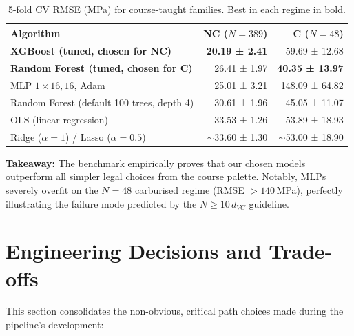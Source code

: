 \documentclass[12pt,a4paper]{article}
\begin{document}
\begin{table}[H]
\centering
\caption{5-fold CV RMSE (MPa) for course-taught families. Best in each regime in bold.}
\label{tab:bench}
\begin{tabular}{lrr}
\toprule
\textbf{Algorithm} & \textbf{NC ($N{=}389$)} & \textbf{C ($N{=}48$)} \\
\midrule
\textbf{XGBoost (tuned, chosen for NC)}            & \textbf{20.19 ± 2.41} & 59.69 ± 12.68 \\
\textbf{Random Forest (tuned, chosen for C)}       & 26.41 ± 1.97          & \textbf{40.35 ± 13.97} \\
MLP $1\times16{,}16$, Adam                         & 25.01 ± 3.21          & 148.09 ± 64.82 \\
Random Forest (default 100 trees, depth 4)         & 30.61 ± 1.96          & 45.05 ± 11.07 \\
OLS (linear regression)                            & 33.53 ± 1.26          & 53.89 ± 18.93 \\
Ridge ($\alpha=1$) / Lasso ($\alpha=0.5$)          & $\sim$33.60 ± 1.30    & $\sim$53.00 ± 18.90 \\
\bottomrule
\end{tabular}
\end{table}

\textbf{Takeaway:} The benchmark empirically proves that our chosen models outperform all simpler legal choices from the course palette. Notably, MLPs severely overfit on the $N=48$ carburised regime (RMSE $>140$\,MPa), perfectly illustrating the failure mode predicted by the $N \geq 10\,d_{VC}$ guideline.
\section{Engineering Decisions and Trade-offs}

This section consolidates the non-obvious, critical path choices made during the pipeline's development:
\end{document}
